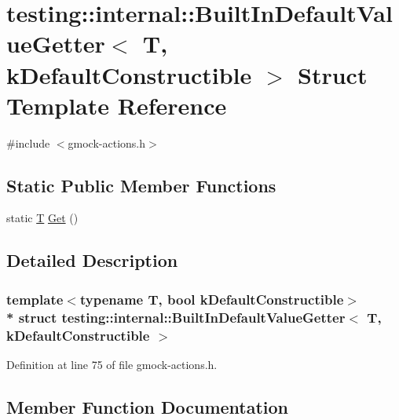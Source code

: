 \hypertarget{structtesting_1_1internal_1_1_built_in_default_value_getter}{}\section{testing\+:\+:internal\+:\+:Built\+In\+Default\+Value\+Getter$<$ T, k\+Default\+Constructible $>$ Struct Template Reference}
\label{structtesting_1_1internal_1_1_built_in_default_value_getter}


{\ttfamily \#include $<$gmock-\/actions.\+h$>$}

\subsection*{Static Public Member Functions}
\begin{DoxyCompactItemize}
\item 
static \hyperlink{functions__7_8js_adf1f3edb9115acb0a1e04209b7a9937b}{T} \hyperlink{structtesting_1_1internal_1_1_built_in_default_value_getter_a61c47c50cdb6ab488dabe2cec3b97fc8}{Get} ()
\end{DoxyCompactItemize}


\subsection{Detailed Description}
\subsubsection*{template$<$typename T, bool k\+Default\+Constructible$>$\\*
struct testing\+::internal\+::\+Built\+In\+Default\+Value\+Getter$<$ T, k\+Default\+Constructible $>$}



Definition at line 75 of file gmock-\/actions.\+h.



\subsection{Member Function Documentation}
